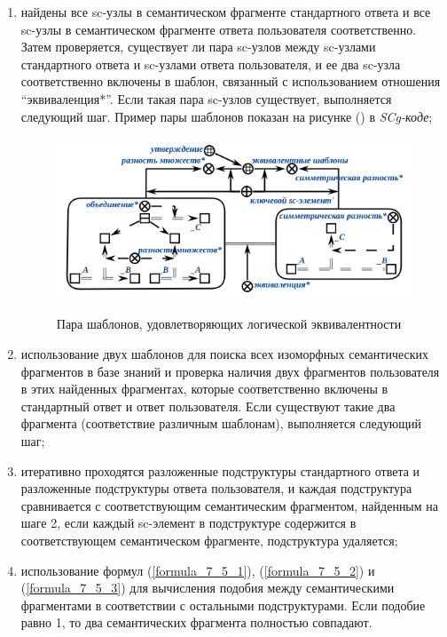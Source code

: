 \begin{enumerate}
	\item найдены все sc-узлы в семантическом фрагменте стандартного ответа и все sc-узлы в семантическом фрагменте ответа пользователя соответственно. Затем проверяется, существует ли пара sc-узлов между sc-узлами стандартного ответа и sc-узлами ответа пользователя, и ее два sc-узла соответственно включены в шаблон, связанный с использованием отношения ``эквиваленция*''. Если такая пара sc-узлов существует, выполняется следующий шаг. Пример пары шаблонов показан на рисунке (\textit{}) в \textit{SCg-коде};
	\begin{figure}[H]
		\caption{Пара шаблонов, удовлетворяющих логической эквивалентности}
		\includegraphics[scale=1]{author/part7/figures/equivalent_template_example.png}
		\label{fig:ET_example}
	\end{figure}
	
	\item использование двух шаблонов для поиска всех изоморфных семантических фрагментов в базе знаний и проверка наличия двух фрагментов пользователя в этих найденных фрагментах, которые соответственно включены в стандартный ответ и ответ пользователя. Если существуют такие два фрагмента (соответствие различным шаблонам), выполняется следующий шаг;
	
	\item итеративно проходятся разложенные подструктуры стандартного ответа и разложенные подструктуры ответа пользователя, и каждая подструктура сравнивается с соответствующим семантическим фрагментом, найденным на шаге 2, если каждый sc-элемент в подструктуре содержится в соответствующем семантическом фрагменте, подструктура удаляется;
	
	\item использование формул (\ref{formula_7_5_1}), (\ref{formula_7_5_2}) и (\ref{formula_7_5_3}) для вычисления подобия между семантическими фрагментами в соответствии с остальными подструктурами. Если подобие равно 1, то два семантических фрагмента полностью совпадают.
	
\end{enumerate}


